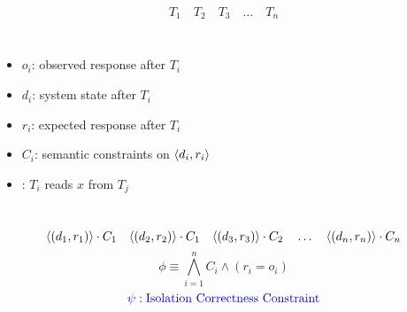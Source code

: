 
\begin{frame}{}
	\begin{center}

		\pause
		\vspace{0.50cm}

		\pause
		\vspace{0.20cm}
	\end{center}
\end{frame}

\begin{frame}{}
	\begin{center}

		\pause
		\vspace{0.50cm}
	\end{center}
\end{frame}

\begin{frame}{}
	\[
		T_{1}\quad T_{2}\quad T_{3}\quad \ldots\quad T_{n}
	\]
	\begin{columns}
		  \begin{itemize}
				\item $o_{i}$: observed response after $T_{i}$
				\item $d_{i}$: system state after $T_{i}$
				\item $r_{i}$: expected response after $T_{i}$
				\item $C_{i}$: semantic constraints on $\langle d_{i}, r_{i}\rangle$
				\item {}: $T_{i}$ reads $x$ from $T_{j}$
			\end{itemize}
	\end{columns}
	\pause
	\[
		\langle(d_{1}, r_{1})\rangle \cdot C_{1} \quad
		\langle(d_{2}, r_{2})\rangle \cdot C_{1} \quad
		\langle(d_{3}, r_{3})\rangle \cdot C_{2} \quad\ldots\quad
		\langle(d_{n}, r_{n})\rangle \cdot C_{n}
	\]
	\pause
	\[
		\phi \equiv \bigwedge_{i=1}^{n} C_{i} \land (r_{i} = o_{i})
	\]
	\pause
	\[
		\textcolor{blue}{\psi: \text{Isolation Correctness Constraint}}
	\]
\end{frame}

